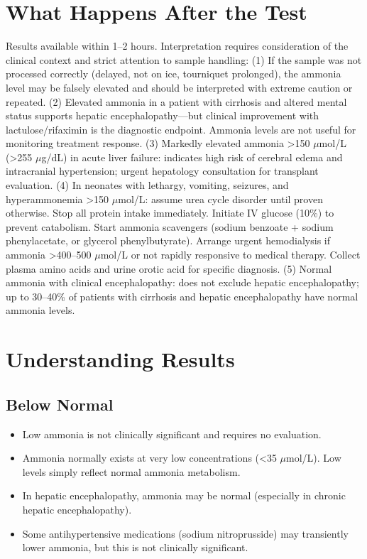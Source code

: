 \section*{What Happens After the Test}
Results available within 1--2 hours. Interpretation requires consideration of the clinical context and strict attention to sample handling: (1) If the sample was not processed correctly (delayed, not on ice, tourniquet prolonged), the ammonia level may be falsely elevated and should be interpreted with extreme caution or repeated. (2) Elevated ammonia in a patient with cirrhosis and altered mental status supports hepatic encephalopathy---but clinical improvement with lactulose/rifaximin is the diagnostic endpoint. Ammonia levels are not useful for monitoring treatment response. (3) Markedly elevated ammonia >150 $\mu$mol/L (>255 $\mu$g/dL) in acute liver failure: indicates high risk of cerebral edema and intracranial hypertension; urgent hepatology consultation for transplant evaluation. (4) In neonates with lethargy, vomiting, seizures, and hyperammonemia >150 $\mu$mol/L: assume urea cycle disorder until proven otherwise. Stop all protein intake immediately. Initiate IV glucose (10\%) to prevent catabolism. Start ammonia scavengers (sodium benzoate + sodium phenylacetate, or glycerol phenylbutyrate). Arrange urgent hemodialysis if ammonia >400--500 $\mu$mol/L or not rapidly responsive to medical therapy. Collect plasma amino acids and urine orotic acid for specific diagnosis. (5) Normal ammonia with clinical encephalopathy: does not exclude hepatic encephalopathy; up to 30--40\% of patients with cirrhosis and hepatic encephalopathy have normal ammonia levels.

\section*{Understanding Results}

\subsection*{Below Normal}
\begin{itemize}
  \item Low ammonia is not clinically significant and requires no evaluation.
  \item Ammonia normally exists at very low concentrations (<35 $\mu$mol/L). Low levels simply reflect normal ammonia metabolism.
  \item In hepatic encephalopathy, ammonia may be normal (especially in chronic hepatic encephalopathy).
  \item Some antihypertensive medications (sodium nitroprusside) may transiently lower ammonia, but this is not clinically significant.
\end{itemize}

